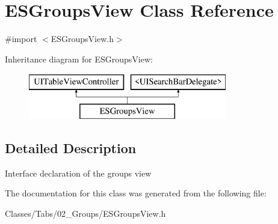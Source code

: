 \hypertarget{interface_e_s_groups_view}{}\section{E\+S\+Groups\+View Class Reference}
\label{interface_e_s_groups_view}


{\ttfamily \#import $<$E\+S\+Groups\+View.\+h$>$}

Inheritance diagram for E\+S\+Groups\+View\+:\begin{figure}[H]
\begin{center}
\leavevmode
\includegraphics[height=2.000000cm]{interface_e_s_groups_view}
\end{center}
\end{figure}


\subsection{Detailed Description}
Interface declaration of the groups view 

The documentation for this class was generated from the following file\+:\begin{DoxyCompactItemize}
\item 
Classes/\+Tabs/02\+\_\+\+Groups/E\+S\+Groups\+View.\+h\end{DoxyCompactItemize}
